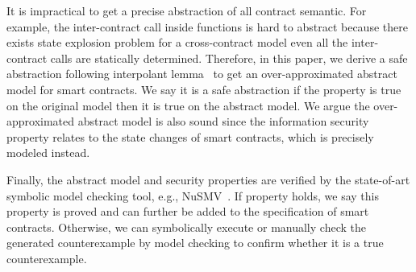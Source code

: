 It is impractical to get a precise abstraction of all contract semantic.
For example, the inter-contract call inside functions is hard to abstract because there exists state explosion problem for a cross-contract model even all the inter-contract calls are statically determined.
Therefore, in this paper, we derive a safe abstraction following interpolant lemma~\cite{craig1957three} to get an over-approximated abstract model for smart contracts.
We say it is a safe abstraction if the property is true on the original model then it is true on the abstract model.
We argue the over-approximated abstract model is also sound since the information security property relates to the state changes of smart contracts, which is precisely modeled instead. 

Finally, the abstract model and security properties are verified by the state-of-art symbolic model checking tool, e.g., NuSMV~\cite{cimatti1999nusmv}. 
If property holds, we say this property is proved and can further be added to the specification of smart contracts.
Otherwise, we can symbolically execute or manually check the generated counterexample by model checking to confirm whether it is a true counterexample.
%
%	
